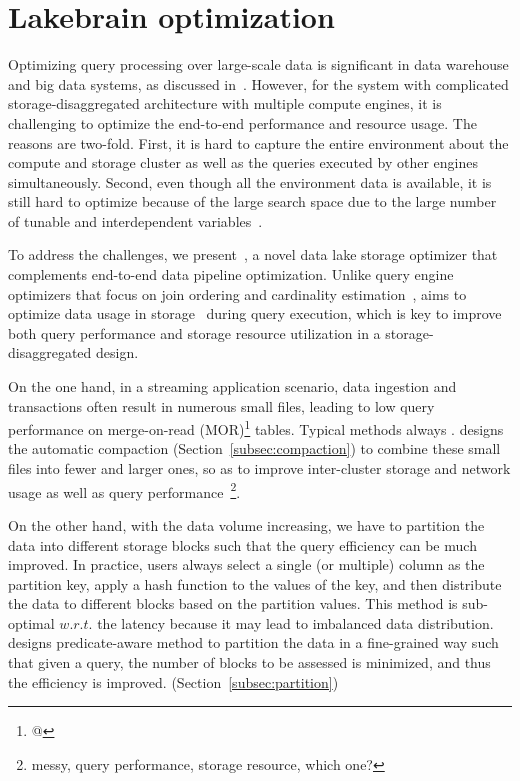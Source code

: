 \section{Lakebrain optimization} 
\label{sec:lakebrain}

Optimizing  query processing over large-scale data is significant in data warehouse and big data systems, as discussed in~\cite{}. However, for the \sys system with
complicated storage-disaggregated architecture with  multiple compute engines, it is challenging to optimize the end-to-end performance and resource usage. The reasons are two-fold. First, it is hard to capture the entire environment about the compute and storage cluster as well as the queries executed by other engines simultaneously. Second, even though all the environment data is available, it is still hard to optimize because of the large search space due to the large number of tunable and interdependent variables~\cite{}.



To address the challenges, we present~\brain, a novel data lake storage optimizer that complements end-to-end data pipeline optimization. Unlike query engine optimizers that focus on join ordering and cardinality estimation~\cite{}, \brain aims to optimize data usage in storage~ during query execution, which is key to improve both query performance and storage resource utilization in a storage-disaggregated design.


On the one hand, in a streaming application scenario, data ingestion and transactions often result in numerous small files, leading to low query performance on merge-on-read (MOR)\footnote{@} tables. Typical methods always .
 \brain  designs the automatic compaction (Section~\ref{subsec:compaction}) to combine these small files into fewer and larger ones, so as to  improve inter-cluster storage and network usage as well as query performance~\footnote{messy, query performance, storage resource, which one?}.


On the other hand, with the data volume increasing, we  have to partition the data into different storage blocks such that the query efficiency can be much improved. In practice, users always select a single (or multiple) column as the partition key,  apply   a hash function to the values of the key, and then distribute the data to different blocks based on the partition values. This method is sub-optimal $w.r.t.$ the latency because it may lead to imbalanced data distribution. \brain  designs predicate-aware  method to partition the data in a fine-grained way such that given a query, the number of blocks to be assessed is minimized, and thus the efficiency is improved. (Section~\ref{subsec:partition})


